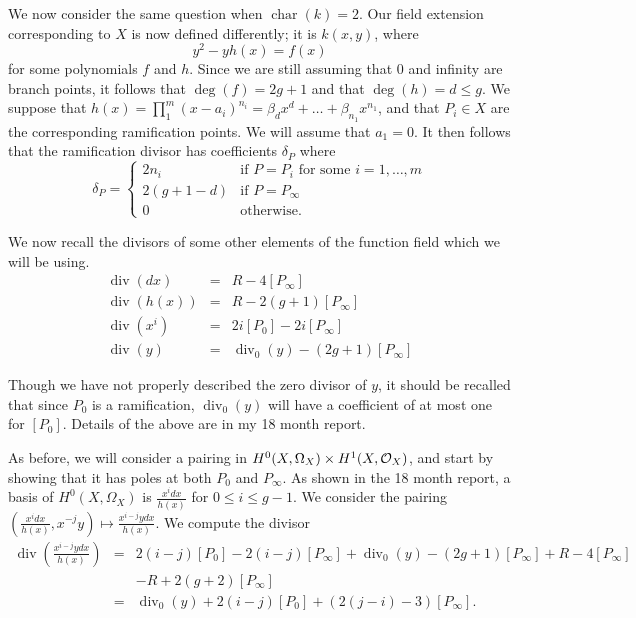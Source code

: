 \documentclass[draft, 11pt]{article} %
\theoremstyle{plain}
\theoremstyle{remark}
\newcommand{\cO}{{\cal O}}
\DeclareMathOperator{\di}{div}
\DeclareMathOperator{\cha}{char}
\begin{document}
We now consider the same question when $\cha (k) = 2$.
Our field extension corresponding to $X$ is now defined differently; it is $k(x,y)$, where
\[
y^2 - yh(x) = f(x)
\]
for some polynomials $f$ and $h$.
Since we are still assuming that $0$ and infinity are branch points, it follows that $\deg(f) = 2g+1$ and that $\deg(h)  = d  \leq g$. 
We suppose that $h(x) = \prod_1^m (x-a_i)^{n_i} = \beta_d x^d + \ldots + \beta_{n_1} x^{n_1}$, and that $P_i\in X$ are the corresponding ramification points.
We will assume that $a_1 = 0$.
It then follows that the ramification divisor has coefficients $\delta_P$ where
\[
\delta_P = \left \{ \begin{array}{ll}
2n_i & \text{if } P= P_i \text{ for some } i=1, \ldots , m \\
2(g+1-d) & \text{if } P=P_\infty \\
0 & \text{otherwise.}
\end{array}
\right.
\]


We now recall the divisors of some other elements of the function field which we will be using.
\begin{eqnarray*}
\di (dx) & = & R - 4[P_\infty] \\
\di (h(x)) & = & R - 2(g+1)[P_\infty] \\
\di (x^i) & = & 2i[P_0] - 2i[P_\infty]\\
\di (y) & = & \di_0(y) - (2g+1)[P_\infty]
\end{eqnarray*}

Though we have not properly described the zero divisor of $y$, it should be recalled that since $P_0$ is a ramification, $\di_0(y)$ will have a coefficient of at most one for $[P_0]$.
Details of the above are in my 18 month report.

As before, we will consider a pairing in $H^0(X,\Omega_X) \times H^1(X,\cO_X)$, and start by showing that it has poles at both $P_0$ and $P_\infty$.
As shown in the 18 month report, a basis of $H^0(X,\Omega_X)$ is $\frac{x^idx}{h(x)}$ for $0 \leq i \leq g-1$.
We consider the pairing $\left(\frac{x^idx}{h(x)}, x^{-j}y\right) \mapsto \frac{x^{i-j}ydx}{h(x)}$.
We compute the divisor
\begin{eqnarray*}
\di\left(\frac{x^{i-j}ydx}{h(x)}\right)  & = & 2(i-j)[P_0] - 2(i-j)[P_\infty] + \di_0(y) - (2g+1)[P_\infty] +R -4[P_\infty] \\
& & -R +2(g+2)[P_\infty] \\
& = &  \di_0(y) + 2(i-j)[P_0] +(2(j-i)-3)[P_\infty].
\end{eqnarray*}
\end{document}
